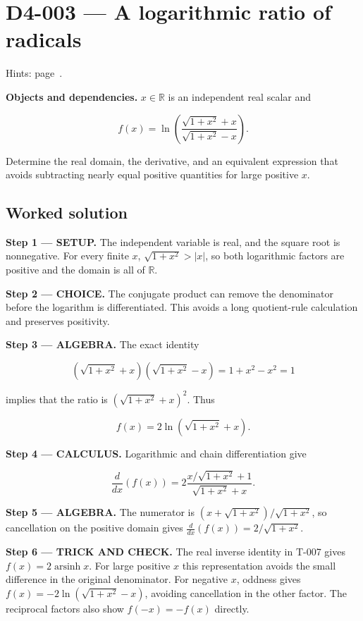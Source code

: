 \documentclass[11pt,oneside,openany]{book}
\begin{document}
\section{D4-003 --- A logarithmic ratio of radicals}
\label{problem:D4-003}
{\small Hints: page~\pageref{hints:D4-003}.}\par\medskip

\textbf{Objects and dependencies.} \(x\in\mathbb R\) is an independent real scalar and

\[
f(x)=\ln\left(\frac{\sqrt{1+x^2}+x}{\sqrt{1+x^2}-x}\right).
\]

Determine the real domain, the derivative, and an equivalent expression that avoids subtracting nearly equal positive quantities for large positive \(x\).
\subsection*{Worked solution}

\textbf{Step 1 --- SETUP.} The independent variable is real, and the square root is nonnegative. For every finite \(x\), \(\sqrt{1+x^2}>|x|\), so both logarithmic factors are positive and the domain is all of \(\mathbb R\).

\begin{ChoiceStep}
\textbf{Step 2 --- CHOICE.} The conjugate product can remove the denominator before the logarithm is differentiated. This avoids a long quotient-rule calculation and preserves positivity.

\end{ChoiceStep}
\begingroup\color{AlgebraBlue}
\textbf{Step 3 --- ALGEBRA.} The exact identity

\[
(\sqrt{1+x^2}+x)(\sqrt{1+x^2}-x)=1+x^2-x^2=1
\]

implies that the ratio is \((\sqrt{1+x^2}+x)^2\). Thus

\[
f(x)=2\ln(\sqrt{1+x^2}+x).
\]

\endgroup
\textbf{Step 4 --- CALCULUS.} Logarithmic and chain differentiation give

\[
\frac{d}{dx}\left(f(x)\right)
=2\frac{x/\sqrt{1+x^2}+1}{\sqrt{1+x^2}+x}.
\]

\begingroup\color{AlgebraBlue}
\textbf{Step 5 --- ALGEBRA.} The numerator is \((x+\sqrt{1+x^2})/\sqrt{1+x^2}\), so cancellation on the positive domain gives \(\frac{d}{dx}(f(x))=2/\sqrt{1+x^2}\).

\endgroup
\begingroup\color{TrickPurple}
\textbf{Step 6 --- TRICK AND CHECK.} The real inverse identity in T-007 gives \(f(x)=2\operatorname{arsinh}x\). For large positive \(x\) this representation avoids the small difference in the original denominator. For negative \(x\), oddness gives \(f(x)=-2\ln(\sqrt{1+x^2}-x)\), avoiding cancellation in the other factor. The reciprocal factors also show \(f(-x)=-f(x)\) directly.
\end{document}
